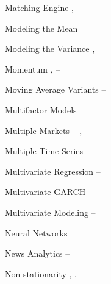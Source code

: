 \begin{multicols}{2}
{Matching Engine \hfill \pageref{in:matcheng1}, \pageref{in:matcheng2} \par

Modeling the Mean \hfill \pageref{in:modelmean} \par

Modeling the Variance \hfill \pageref{in:modelvar1}, \pageref{in:modelvar2} \par

Momentum \hfill \pageref{in:mom1}, \pageref{in:mom2}--\pageref{in:mom3} \par

Moving Average Variants \hfill \pageref{in:mva1}--\pageref{in:mva2} \par %

Multifactor Models \hfill \pageref{in:mfm1} \par%

Multiple Markets \hfill  \pageref{in:multmark}, \pageref{in:mult_mark} \par

Multiple Time Series \hfill \pageref{in:mts1}--\pageref{in:mts2} \par

Multivariate Regression \hfill \pageref{in:multreg1}--\pageref{in:multreg2} \par %

Multivariate GARCH \hfill \pageref{in:multgarch1}--\pageref{in:multgarch2} \par

Multivariate Modeling \hfill \pageref{in:multimod1}--\pageref{in:multimod2} \pspace





Neural Networks \hfill \pageref{in:neural_net} \par

News Analytics \hfill \pageref{in:newsan1}--\pageref{in:newsan2} \par

Non-stationarity \hfill \pageref{in:nonstat1}, \pageref{in:nonstat2}, \pageref{in:nonstat3} \par


}
\end{multicols}
